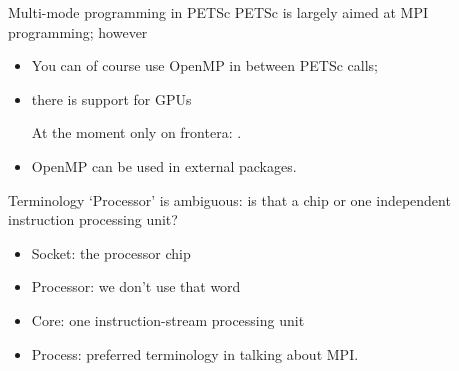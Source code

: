 




\begin{frame}{Multi-mode programming in PETSc}
  PETSc is largely aimed at MPI programming; however
  \begin{itemize}
  \item You can of course use OpenMP in between PETSc calls;
  \item there is support for GPUs
\begin{taccnote}
At the moment only on frontera: .
\end{taccnote}
  \item OpenMP can be used in external packages.
  \end{itemize}
\end{frame}

\begin{frame}{Terminology}
  `Processor' is ambiguous: is that a chip or one independent
  instruction processing unit?
  \begin{itemize}
  \item Socket: the processor chip
  \item Processor: we don't use that word
  \item Core: one instruction-stream processing unit
  \item Process: preferred terminology in talking about MPI.
  \end{itemize}  
\end{frame}

